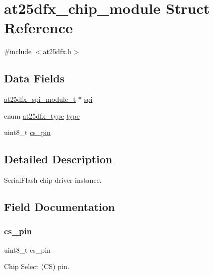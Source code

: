 \hypertarget{structat25dfx__chip__module}{}\section{at25dfx\+\_\+chip\+\_\+module Struct Reference}
\label{structat25dfx__chip__module}


{\ttfamily \#include $<$at25dfx.\+h$>$}

\subsection*{Data Fields}
\begin{DoxyCompactItemize}
\item 
\mbox{\hyperlink{group__asfdoc__common2__at25dfx__group_ga78981ccb6b863d6548f343fe01792406}{at25dfx\+\_\+spi\+\_\+module\+\_\+t}} $\ast$ \mbox{\hyperlink{structat25dfx__chip__module_a6f4162eb6fa66622b07084a19f38fd67}{spi}}
\item 
enum \mbox{\hyperlink{group__asfdoc__common2__at25dfx__group_ga98ba30dd90f741beb7f8d47e7725471d}{at25dfx\+\_\+type}} \mbox{\hyperlink{structat25dfx__chip__module_a71bd7aaba8d2006d07410e3ee92755db}{type}}
\item 
uint8\+\_\+t \mbox{\hyperlink{structat25dfx__chip__module_aed65b23a4e5c39c4267c5730833e70db}{cs\+\_\+pin}}
\end{DoxyCompactItemize}


\subsection{Detailed Description}
Serial\+Flash chip driver instance. 

\subsection{Field Documentation}
\mbox{\label{structat25dfx__chip__module_aed65b23a4e5c39c4267c5730833e70db}} 
\subsubsection{\texorpdfstring{cs\_pin}{cs\_pin}}
{\footnotesize\ttfamily uint8\+\_\+t cs\+\_\+pin}

Chip Select (CS) pin. \mbox{\label{structat25dfx__chip__module_a6f4162eb6fa66622b07084a19f38fd67}} 
